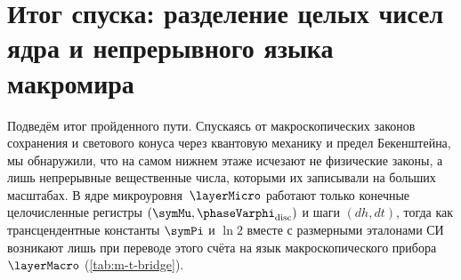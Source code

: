 \section{Итог спуска: разделение целых чисел ядра и непрерывного языка макромира}
\label{sec:coords-bridge}

Подведём итог пройденного пути.
Спускаясь от макроскопических законов сохранения и светового конуса через квантовую механику и предел Бекенштейна, мы обнаружили, что на самом нижнем этаже исчезают не физические законы, а лишь непрерывные вещественные числа, которыми их записывали на больших масштабах.
В ядре микроуровня~$\layerMicro$ работают только конечные целочисленные регистры $(\symMu, \phaseVarphi_{\mathrm{disc}})$ и шаги $(dh, dt)$, тогда как трансцендентные константы $\symPi$ и $\ln 2$ вместе с размерными эталонами СИ возникают лишь при переводе этого счёта на язык макроскопического прибора~$\layerMacro$ (\cref{tab:m-t-bridge}).


